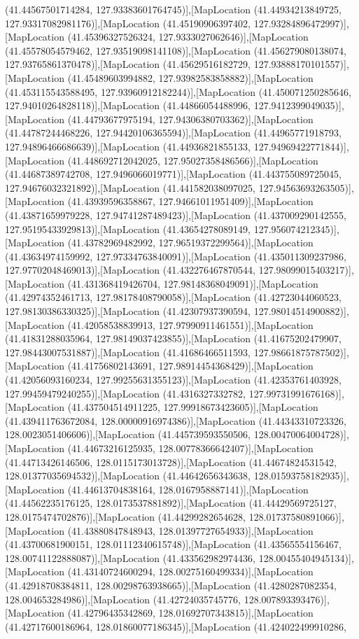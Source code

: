 (41.44567501714284, 127.93383601764745)],[MapLocation (41.44934213849725, 127.93317082981176)],[MapLocation (41.45190906397402, 127.93284896472997)],[MapLocation (41.45396327526324, 127.9333027062646)],[MapLocation (41.45578054579462, 127.93519098141108)],[MapLocation (41.456279080138074, 127.93765861370478)],[MapLocation (41.45629516182729, 127.93888170101557)],[MapLocation (41.45489603994882, 127.93982583858882)],[MapLocation (41.453115543588495, 127.93960912182244)],[MapLocation (41.450071250285646, 127.94010264828118)],[MapLocation (41.44866054488996, 127.9412399049035)],[MapLocation (41.44793677975194, 127.94306380703362)],[MapLocation (41.44787244468226, 127.94420106365594)],[MapLocation (41.44965771918793, 127.94896466686639)],[MapLocation (41.44936821855133, 127.94969422771844)],[MapLocation (41.448692712042025, 127.95027358486566)],[MapLocation (41.44687389742708, 127.9496066019771)],[MapLocation (41.443755089725045, 127.94676032321892)],[MapLocation (41.441582038097025, 127.94563693263505)],[MapLocation (41.43939596358867, 127.94661011951409)],[MapLocation (41.43871659979228, 127.94741287489423)],[MapLocation (41.437009290142555, 127.95195433929813)],[MapLocation (41.43654278089149, 127.956074212345)],[MapLocation (41.43782969482992, 127.96519372299564)],[MapLocation (41.43634974159992, 127.97334763840091)],[MapLocation (41.435011309237986, 127.97702048469013)],[MapLocation (41.432276467870544, 127.98099015403217)],[MapLocation (41.431368419426704, 127.98148368049091)],[MapLocation (41.42974352461713, 127.98178408790058)],[MapLocation (41.42723044060523, 127.98130386330325)],[MapLocation (41.42307937390594, 127.98014514900882)],[MapLocation (41.42058538839913, 127.97990911461551)],[MapLocation (41.41831288035964, 127.98149037423855)],[MapLocation (41.41675202479907, 127.98443007531887)],[MapLocation (41.41686466511593, 127.98661875787502)],[MapLocation (41.41756802143691, 127.98914454368429)],[MapLocation (41.42056093160234, 127.99255631355123)],[MapLocation (41.42353761403928, 127.99459479240255)],[MapLocation (41.4316327332782, 127.99731991676168)],[MapLocation (41.437504514911225, 127.99918673423605)],[MapLocation (41.439411763672084, 128.00000916974386)],[MapLocation (41.44343310723326, 128.0023051406606)],[MapLocation (41.445739593550506, 128.00470064004728)],[MapLocation (41.44673216125935, 128.00778366642407)],[MapLocation (41.44713426146506, 128.0115173013728)],[MapLocation (41.44674824531542, 128.01377035694532)],[MapLocation (41.44642656343638, 128.01593758182935)],[MapLocation (41.44613704838164, 128.0167958887141)],[MapLocation (41.44562235176125, 128.0173537881892)],[MapLocation (41.44429569725127, 128.0175474702876)],[MapLocation (41.44299282654628, 128.01737580891066)],[MapLocation (41.43880847848943, 128.01397727654933)],[MapLocation (41.43700681900151, 128.01112340615748)],[MapLocation (41.43565554156467, 128.00741122888087)],[MapLocation (41.433562982974436, 128.00455404945134)],[MapLocation (41.43140724600294, 128.00275160499334)],[MapLocation (41.42918708384811, 128.00298763938665)],[MapLocation (41.4280287082354, 128.004653284986)],[MapLocation (41.42724035745776, 128.007893393476)],[MapLocation (41.42796435342869, 128.01692707343815)],[MapLocation (41.42717600186964, 128.01860077186345)],[MapLocation (41.424022499910286, 